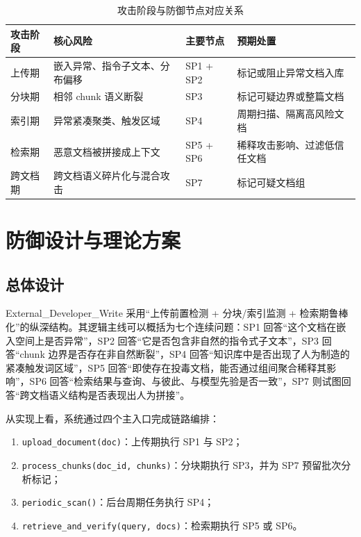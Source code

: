 \documentclass[11pt,a4paper]{ctexart}
\begin{document}
\begin{table}[H]
\centering
\caption{攻击阶段与防御节点对应关系}
\label{tab:type4-stage-defense-map}
\begin{tabular}{p{2.3cm} p{4.4cm} p{3.4cm} p{3.7cm}}
\toprule
攻击阶段 & 核心风险 & 主要节点 & 预期处置 \\
\midrule
上传期 & 嵌入异常、指令子文本、分布偏移 & SP1 + SP2 & 标记或阻止异常文档入库 \\
分块期 & 相邻 chunk 语义断裂 & SP3 & 标记可疑边界或整篇文档 \\
索引期 & 异常紧凑聚类、触发区域 & SP4 & 周期扫描、隔离高风险文档 \\
检索期 & 恶意文档被拼接成上下文 & SP5 + SP6 & 稀释攻击影响、过滤低信任文档 \\
跨文档期 & 跨文档语义碎片化与混合攻击 & SP7 & 标记可疑文档组 \\
\bottomrule
\end{tabular}
\end{table}

\section{防御设计与理论方案}

\subsection{总体设计}
External\_Developer\_Write 采用“上传前置检测 + 分块/索引监测 + 检索期鲁棒化”的纵深结构。其逻辑主线可以概括为七个连续问题：SP1 回答“这个文档在嵌入空间上是否异常”，SP2 回答“它是否包含非自然的指令式子文本”，SP3 回答“chunk 边界是否存在非自然断裂”，SP4 回答“知识库中是否出现了人为制造的紧凑触发词区域”，SP5 回答“即使存在投毒文档，能否通过组间聚合稀释其影响”，SP6 回答“检索结果与查询、与彼此、与模型先验是否一致”，SP7 则试图回答“跨文档语义结构是否表现出人为拼接”。

从实现上看，系统通过四个主入口完成链路编排：
\begin{enumerate}[leftmargin=2em]
  \item \texttt{upload\_document(doc)}：上传期执行 SP1 与 SP2；
  \item \texttt{process\_chunks(doc\_id, chunks)}：分块期执行 SP3，并为 SP7 预留批次分析标记；
  \item \texttt{periodic\_scan()}：后台周期任务执行 SP4；
  \item \texttt{retrieve\_and\_verify(query, docs)}：检索期执行 SP5 或 SP6。
\end{enumerate}
\end{document}
